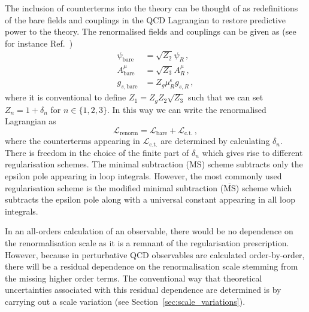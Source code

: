 \documentclass[main.tex]{subfiles}
\begin{document}
    The inclusion of counterterms into the theory can be
    thought of as redefinitions of the bare fields
    and couplings in the QCD Lagrangian to restore predictive
    power to the theory. The renormalised fields and couplings
    can be given as (see for instance Ref.~\cite{mangano1999introduction})
    \begin{align}\label{eqn:renormlised_fields}
        \psi_{\mathrm{bare}} &= \sqrt{Z_{2}} \psi_{R} \, , \nonumber \\
        A_{\mathrm{bare}}^{\mu} &= \sqrt{Z_{3}} A_{R}^{\mu} \, ,\\
        g_{s,\mathrm{bare}} &= Z_{g} \mu_{R}^{\epsilon} g_{s,R} \, , \nonumber
    \end{align}
    where it is conventional to define $Z_{1} = Z_{g}Z_{2}\sqrt{Z_{3}}$
    such that we can set $Z_{n} = 1 + \delta_{n}$ for $n \in \{1, 2, 3\}$.
    In this way we can write the renormalised Lagrangian as
    \begin{equation}
        \mathcal{L}_{\mathrm{renorm}} = \mathcal{L}_{\mathrm{bare}} + \mathcal{L}_{\mathrm{c.t.}} \, ,
    \end{equation}
    where the counterterms appearing in $\mathcal{L}_{\mathrm{c.t.}}$
    are determined by calculating $\delta_{n}$. There is freedom
    in the choice of the finite part of $\delta_{n}$ which gives rise to
    different regularisation schemes. The minimal subtraction
    (MS) scheme subtracts only the epsilon pole appearing
    in loop integrals. However, the most
    commonly used regularisation scheme is the modified minimal
    subtraction ($\overline{\mathrm{MS}}$) scheme which subtracts the
    epsilon pole along with a universal constant appearing in all
    loop integrals.

    In an all-orders calculation of an observable,
    there would be no dependence on the renormalisation
    scale as it is a remnant of the regularisation prescription.
    However, because in perturbative QCD observables
    are calculated order-by-order, there will be a residual
    dependence on the renormalisation scale stemming from
    the missing higher order terms. The conventional way
    that theoretical uncertainties associated
    with this residual dependence are determined is by carrying out
    a scale variation (see Section~\ref{sec:scale_variations}).
\end{document}
